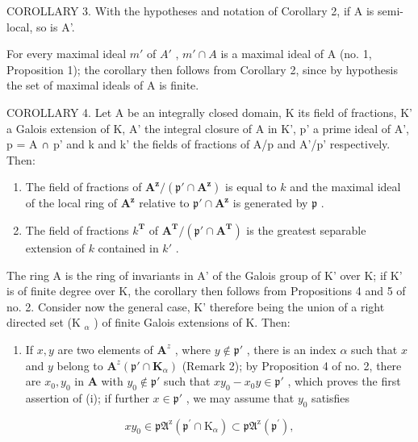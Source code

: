 COROLLARY 3. With the hypotheses and notation of Corollary 2, if A is semi-local, so is A'.

For every maximal ideal \(m'\) of \(A'\) , \(m' \cap A\) is a maximal ideal of A (no. 1, Proposition 1); the corollary then follows from Corollary 2, since by hypothesis the set of maximal ideals of A is finite.

COROLLARY 4. Let A be an integrally closed domain, K its field of fractions, K' a Galois extension of K, A' the integral closure of A in K', p' a prime ideal of A', p = A ∩ p' and k and k' the fields of fractions of A/p and A'/p' respectively. Then:

\begin{enumerate}
\def\labelenumi{(\roman{enumi})}
\item
  The field of fractions of \(\mathbf{A}^{\mathbf{z}} / (\mathfrak{p}'\cap \mathbf{A}^{\mathbf{z}})\) is equal to \(k\) and the maximal ideal of the local ring of \(\mathbf{A}^{\mathbf{z}}\) relative to \(\mathfrak{p}'\cap \mathbf{A}^{\mathbf{z}}\) is generated by \(\mathfrak{p}\) .
\item
  The field of fractions \(k^{\mathbf{T}}\) of \(\mathbf{A}^{\mathbf{T}} / (\mathfrak{p}' \cap \mathbf{A}^{\mathbf{T}})\) is the greatest separable extension of \(k\) contained in \(k'\) .
\end{enumerate}

The ring A is the ring of invariants in A' of the Galois group of K' over K; if K' is of finite degree over K, the corollary then follows from Propositions 4 and 5 of no. 2. Consider now the general case, K' therefore being the union of a right directed set (K \(_{\alpha}\) ) of finite Galois extensions of K. Then:

\begin{enumerate}
\def\labelenumi{(\roman{enumi})}
\tightlist
\item
  If \(x, y\) are two elements of \(\mathbf{A}^z\) , where \(y \notin \mathfrak{p}'\) , there is an index \(\alpha\) such that \(x\) and \(y\) belong to \(\mathbf{A}^z(\mathfrak{p}' \cap \mathbf{K}_\alpha)\) (Remark 2); by Proposition 4 of no. 2, there are \(x_0, y_0\) in \(\mathbf{A}\) with \(y_0 \notin \mathfrak{p}'\) such that \(xy_0 - x_0y \in \mathfrak{p}'\) , which proves the first assertion of (i); if further \(x \in \mathfrak{p}'\) , we may assume that \(y_0\) satisfies
\end{enumerate}

\[
x y _ {0} \in \mathfrak {p A} ^ {\mathrm{z}} (\mathfrak {p} ^ {\prime} \cap \mathrm{K} _ {\alpha}) \subset \mathfrak {p A} ^ {\mathrm{z}} (\mathfrak {p} ^ {\prime}),
\]

